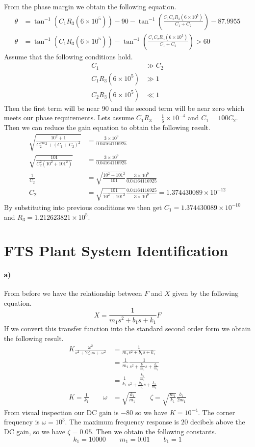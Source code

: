 \documentclass[12pt]{article}
\begin{document}
From the phase margin we obtain the following equation.
\begin{align*}
    \theta &= \tan^{-1}(C_1R_3(6\times 10^5))-90-\tan^{-1}\left(\frac{C_1C_2R_3(6\times 10^5)}{C_1+C_2}\right)-87.9955\\
    \theta &= \tan^{-1}(C_1R_3(6\times 10^5))-\tan^{-1}\left(\frac{C_1C_2R_3(6\times 10^5)}{C_1+C_2}\right) > 60
\end{align*}
Assume that the following conditions hold.
\begin{align*}
    C_1 &\gg C_2\\
    C_1R_3(6\times 10^5) &\gg 1\\
    C_2R_3(6\times 10^5) &\ll 1
\end{align*}
Then the first term will be near 90 and the second term will be near zero which meets our phase requirements.
Lets assume \(C_1R_3 = \frac{1}{6} \times 10^{-4}\) and \(C_1 = 100C_2\). Then we can reduce the gain
equation to obtain the following result.
\begin{align*}
    \sqrt{\frac{10^2 + 1}{C_2^210^2 + (C_1 + C_2)^2}}&=\frac{3\times10^9}{0.04164116925}\\
    \sqrt{\frac{101}{C_2^2(10^2+101^2)}}&=\frac{3\times10^9}{0.04164116925}\\
    \frac{1}{C_2}&=\sqrt{\frac{10^2+101^2}{101}}\frac{3\times10^9}{0.04164116925}\\
    C_2&=\sqrt{\frac{101}{10^2+101^2}}\frac{0.04164116925}{3\times10^9}=1.374430089\times 10^{-12}
\end{align*}
By substituting into previous conditions we then get \(C_1=1.374430089\times 10^{-10}\) and \(R_3=1.212623821\times10^5\).

\section{FTS Plant System Identification}

\paragraph{a)}

From before we have the relationship between \(F\) and \(X\) given by the following equation.
\[X=\frac{1}{m_1s^2 + b_1s + k_1}F\]
If we convert this transfer function into the standard second order form we obtain the following result.
\begin{align*}
    K\frac{\omega^2}{s^2+2\zeta\omega s + \omega^2}&=\frac{1}{m_1s^2 + b_1s + k_1}\\
    &=\frac{1}{m_1}\frac{1}{s^2 + \frac{b_1}{m_1}s + \frac{k_1}{m_1}}\\
    &=\frac{1}{k_1}\frac{\frac{k_1}{m_1}}{s^2 + \frac{b_1}{m_1}s + \frac{k_1}{m_1}}\\
    K=\frac{1}{k_1}\qquad \omega&=\sqrt{\frac{k_1}{m_1}}\qquad\zeta=\sqrt{\frac{m_1}{k_1}}\frac{b_1}{2m_1}
\end{align*}
From visual inspection our DC gain is \(-80\) so we have \(K=10^{-4}\). The corner frequency is \(\omega=10^3\).
The maximum frequency response is \(20\) decibels above the DC gain, so we have \(\zeta=0.05\). Then we obtain
the following constants.
\[k_1=10000 \qquad m_1=0.01 \qquad b_1=1\]
\end{document}

